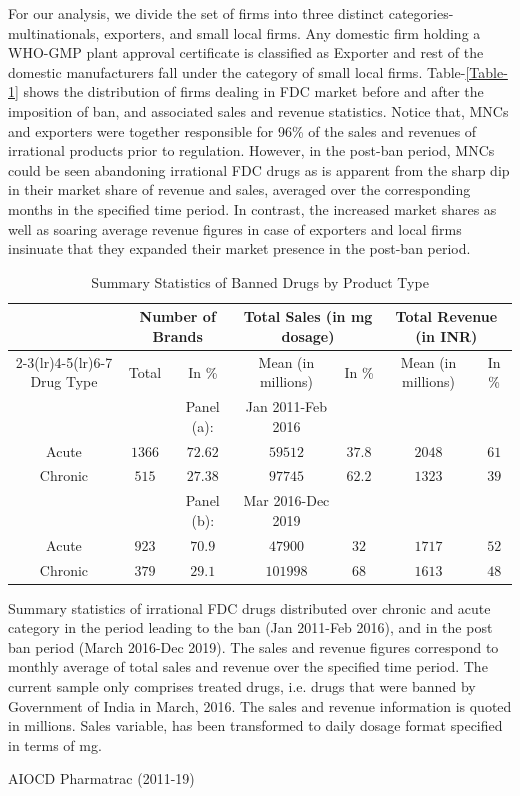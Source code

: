 \documentclass[AER]{AEA}
\theoremstyle{theorem}
\begin{document}
For our analysis, we divide the set of firms into three distinct categories- multinationals, exporters, and small local firms. Any domestic firm holding a WHO-GMP plant approval certificate is classified as Exporter and rest of the domestic manufacturers fall under the category of small local firms. Table-\ref{Table-1} shows the distribution of firms dealing in FDC market before and after the imposition of ban, and associated  sales and revenue statistics. Notice that, MNCs and exporters were together responsible for 96\% of the sales and revenues of irrational products prior to regulation. However, in the post-ban period, MNCs could be seen abandoning irrational FDC drugs as is apparent from the sharp dip in their market share of revenue and sales, averaged over the corresponding months in the specified time period. In contrast, the increased market shares  as well as soaring average revenue figures in case of exporters and local firms insinuate that they expanded their market presence in the post-ban period.


\begin{table}[h!] \centering 
	\caption{Summary Statistics of Banned Drugs by Product Type} 
	\label{Table-2} 
	\begin{tabular}{ccccccc}
        \toprule
		& \multicolumn{2}{c}{Number of Brands} & \multicolumn{2}{c}{Total Sales (in mg dosage)} & \multicolumn{2}{c}{Total Revenue (in INR)} \\ 
		\cmidrule(lr){2-3}\cmidrule(lr){4-5}\cmidrule(lr){6-7}
		Drug Type & Total & In \% & Mean (in millions) & In \% & Mean (in millions) & In \% \\ 
		\midrule
		&  & Panel (a): & Jan 2011-Feb 2016 &  &  &  \\ 
		\midrule
		Acute & $1366$ & $72.62$ & $59512$ & $37.8$ & $2048$ & $61$ \\ 
		Chronic & $515$ & $27.38$ & $97745$ & $62.2$ & $1323$ & $39$ \\ 
		\midrule
		&  & Panel (b):  & Mar 2016-Dec 2019 &  &  &  \\
		\midrule
		Acute & $923$ & $70.9$ & $47900$ & $32$ & $1717$ & $52$ \\ 
		Chronic & $379$ & $29.1$ & $101998$ & $68$ & $1613$ & $48$ \\ 
		\toprule 
	\end{tabular}
	\begin{tablenotes}
      Summary statistics of irrational FDC drugs distributed over chronic and acute category in the period leading to the ban (Jan 2011-Feb 2016), and in the post ban period (March 2016-Dec 2019). The sales and revenue figures correspond to monthly average of total sales and revenue over the specified time period.
       The current sample only comprises treated drugs, i.e. drugs that were banned by Government of India in March, 2016. The sales and revenue information is quoted in millions. Sales variable, has been transformed  to daily dosage format specified in terms of mg.
	\end{tablenotes}
	\begin{tablenotes}[Source]
		AIOCD Pharmatrac (2011-19)
	\end{tablenotes}
\end{table} 
\end{document}
